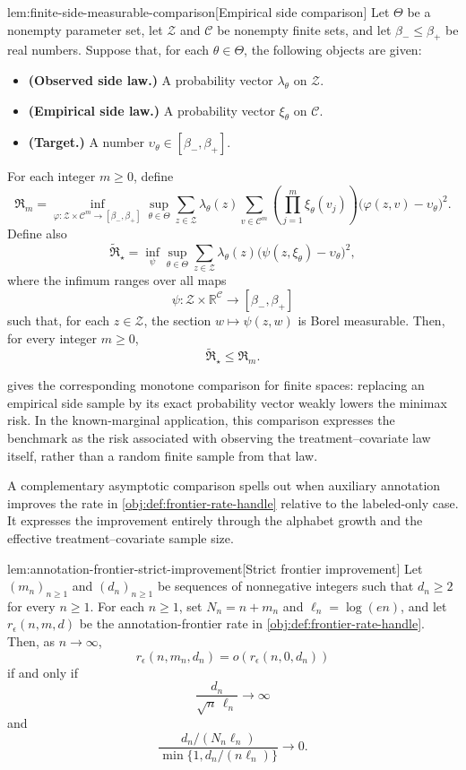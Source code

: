 \documentclass[11pt]{article}
\begin{document}
\begin{lemmav}{lem:finite-side-measurable-comparison}[Empirical side comparison]
Let \(\Theta\) be a nonempty parameter set, let \(\mathcal Z\) and \(\mathcal C\) be nonempty finite sets, and let \(\beta_-\le \beta_+\) be real numbers. Suppose that, for each \(\theta\in\Theta\), the following objects are given:
\begin{itemize}
\item \textbf{(Observed side law.)} A probability vector \(\lambda_\theta\) on \(\mathcal Z\).
\item \textbf{(Empirical side law.)} A probability vector \(\xi_\theta\) on \(\mathcal C\).
\item \textbf{(Target.)} A number \(\upsilon_\theta\in[\beta_-,\beta_+]\).
\end{itemize}
For each integer \(m\ge0\), define
\[
\mathfrak R_m
=
\inf_{\varphi:\mathcal Z\times\mathcal C^m\to[\beta_-,\beta_+]}
\sup_{\theta\in\Theta}
\sum_{z\in\mathcal Z}\lambda_\theta(z)
\sum_{v\in\mathcal C^m}
\left(\prod_{j=1}^m \xi_\theta(v_j)\right)
\bigl(\varphi(z,v)-\upsilon_\theta\bigr)^2 .
\]
Define also
\[
\widetilde{\mathfrak R}_\star
=
\inf_{\psi}
\sup_{\theta\in\Theta}
\sum_{z\in\mathcal Z}\lambda_\theta(z)
\bigl(\psi(z,\xi_\theta)-\upsilon_\theta\bigr)^2 ,
\]
where the infimum ranges over all maps
\[
\psi:\mathcal Z\times\mathbb R^{\mathcal C}\to[\beta_-,\beta_+]
\]
such that, for each \(z\in\mathcal Z\), the section \(w\mapsto\psi(z,w)\) is Borel measurable. Then, for every integer \(m\ge0\),
\[
\widetilde{\mathfrak R}_\star\le \mathfrak R_m .
\]
\end{lemmav}

 gives the corresponding monotone comparison for finite spaces: replacing an empirical side sample by its exact probability vector weakly lowers the minimax risk. In the known-marginal application, this comparison expresses the benchmark as the risk associated with observing the treatment--covariate law itself, rather than a random finite sample from that law.

A complementary asymptotic comparison spells out when auxiliary annotation improves the rate in \cref{obj:def:frontier-rate-handle} relative to the labeled-only case. It expresses the improvement entirely through the alphabet growth and the effective treatment--covariate sample size.

\begin{lemmav}{lem:annotation-frontier-strict-improvement}[Strict frontier improvement]
Let \((m_n)_{n\ge 1}\) and \((d_n)_{n\ge 1}\) be sequences of nonnegative integers such that \(d_n\ge 2\) for every \(n\ge 1\). For each \(n\ge 1\), set \(N_n=n+m_n\) and \(\ell_n=\log(en)\), and let \(r_\epsilon(n,m,d)\) be the annotation-frontier rate in \cref{obj:def:frontier-rate-handle}. Then, as \(n\to\infty\),
\[
r_\epsilon(n,m_n,d_n)
=
o\!\left(r_\epsilon(n,0,d_n)\right)
\]
if and only if
\[
\frac{d_n}{\sqrt n\,\ell_n}\to\infty
\]
and
\[
\frac{d_n/(N_n\ell_n)}
{\min\{1,d_n/(n\ell_n)\}}
\to 0.
\]
\end{lemmav}
\end{document}
